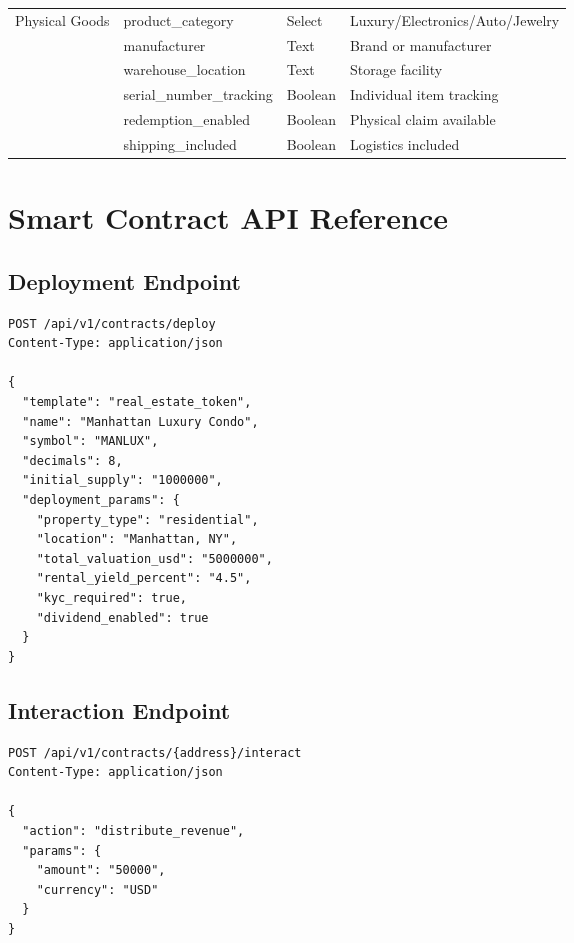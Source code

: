 \documentclass[11pt,a4paper,twoside]{article}
\begin{document}
\begin{longtable}{@{}llll@{}}
\multirow{6}{*}{Physical Goods}
  & product\_category & Select & Luxury/Electronics/Auto/Jewelry \\
  & manufacturer & Text & Brand or manufacturer \\
  & warehouse\_location & Text & Storage facility \\
  & serial\_number\_tracking & Boolean & Individual item tracking \\
  & redemption\_enabled & Boolean & Physical claim available \\
  & shipping\_included & Boolean & Logistics included \\

\end{longtable}

\section{Smart Contract API Reference}
\label{app:api}

\subsection{Deployment Endpoint}

\begin{lstlisting}[style=rustcode, caption={RWA Contract Deployment API}]
POST /api/v1/contracts/deploy
Content-Type: application/json

{
  "template": "real_estate_token",
  "name": "Manhattan Luxury Condo",
  "symbol": "MANLUX",
  "decimals": 8,
  "initial_supply": "1000000",
  "deployment_params": {
    "property_type": "residential",
    "location": "Manhattan, NY",
    "total_valuation_usd": "5000000",
    "rental_yield_percent": "4.5",
    "kyc_required": true,
    "dividend_enabled": true
  }
}
\end{lstlisting}

\subsection{Interaction Endpoint}

\begin{lstlisting}[style=rustcode, caption={RWA Contract Interaction API}]
POST /api/v1/contracts/{address}/interact
Content-Type: application/json

{
  "action": "distribute_revenue",
  "params": {
    "amount": "50000",
    "currency": "USD"
  }
}
\end{lstlisting}
\end{document}
